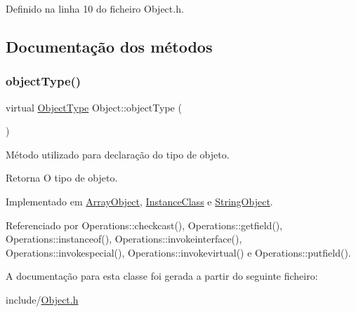Definido na linha 10 do ficheiro Object.\+h.



\subsection{Documentação dos métodos}
\mbox{\label{classObject_a08cee945bc224fc81f4448086625183d}} 
\subsubsection{\texorpdfstring{object\+Type()}{objectType()}}
{\footnotesize\ttfamily virtual \hyperlink{BasicTypes_8h_a842c5e2e69277690b064bf363c017980}{Object\+Type} Object\+::object\+Type (\begin{DoxyParamCaption}{ }\end{DoxyParamCaption})\hspace{0.3cm}{\ttfamily [pure virtual]}}



Método utilizado para declaração do tipo de objeto. 

\begin{DoxyReturn}{Retorna}
O tipo de objeto. 
\end{DoxyReturn}


Implementado em \hyperlink{classArrayObject_a63034d166dcd6caad9261c86c338a417}{Array\+Object}, \hyperlink{classInstanceClass_ae8570307f49cb95cc01fb8d6bda23763}{Instance\+Class} e \hyperlink{classStringObject_a7d89db7df43b17354baf5337edd636b7}{String\+Object}.



Referenciado por Operations\+::checkcast(), Operations\+::getfield(), Operations\+::instanceof(), Operations\+::invokeinterface(), Operations\+::invokespecial(), Operations\+::invokevirtual() e Operations\+::putfield().



A documentação para esta classe foi gerada a partir do seguinte ficheiro\+:\begin{DoxyCompactItemize}
\item 
include/\hyperlink{Object_8h}{Object.\+h}\end{DoxyCompactItemize}
